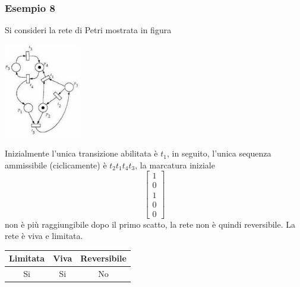\documentclass[10pt, letterpaper]{report}
\begin{document}
\subsubsection{Esempio 8}
Si consideri la rete di Petri mostrata in figura
\begin{center}
    \includegraphics[width=0.25\textwidth]{images/PetriEs7.png}
\end{center}
Inizialmente l'unica transizione abilitata è $t_1$, in seguito, l'unica sequenza ammissibile (ciclicamente) è $t_2t_1t_4t_3$, la marcatura iniziale $$ \begin{bmatrix}
    1\\ 0 \\ 1 \\ 0 \\ 0
\end{bmatrix}$$ non è più raggiungibile dopo il primo scatto, la rete non è quindi reversibile. La rete è viva e limitata.
\begin{center}
    \begin{tabular}{|c|c|c|}
        \hline
        \rowcolor[HTML]{EFEFEF} 
        Limitata & Viva & Reversibile \\ \hline
        Si       & Si   & No          \\ \hline
        \end{tabular}
\end{center}
\flowerLine 
\end{document}
